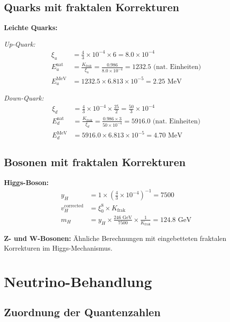 \documentclass[12pt,a4paper]{article}
\begin{document}
\subsection{Quarks mit fraktalen Korrekturen}
\label{subsec:quarks_enhanced}

\textbf{Leichte Quarks:}

\textit{Up-Quark:}
\begin{align}
	\xi_u &= \frac{4}{3} \times 10^{-4} \times 6 = 8.0 \times 10^{-4} \\
	E_u^{\text{nat}} &= \frac{K_{\text{frak}}}{\xi_u} = \frac{0.986}{8.0 \times 10^{-4}} 
	= 1232.5 \text{ (nat. Einheiten)} \\
	E_u^{\text{MeV}} &= 1232.5 \times 6.813 \times 10^{-5} = 2.25 \text{ MeV}
\end{align}

\textit{Down-Quark:}
\begin{align}
	\xi_d &= \frac{4}{3} \times 10^{-4} \times \frac{25}{2} = \frac{50}{3} \times 10^{-4} \\
	E_d^{\text{nat}} &= \frac{K_{\text{frak}}}{\xi_d} = \frac{0.986 \times 3}{50 \times 10^{-4}} 
	= 5916.0 \text{ (nat. Einheiten)} \\
	E_d^{\text{MeV}} &= 5916.0 \times 6.813 \times 10^{-5} = 4.70 \text{ MeV}
\end{align}

\subsection{Bosonen mit fraktalen Korrekturen}
\label{subsec:bosons_enhanced}

\textbf{Higgs-Boson:}
\begin{align}
	y_H &= 1 \times \left(\frac{4}{3} \times 10^{-4}\right)^{-1} = 7500 \\
	v_H^{\text{corrected}} &= \xi_0^8 \times K_{\text{frak}} \\
	m_H &= y_H \times \frac{246 \text{ GeV}}{7500} \times \frac{1}{K_{\text{frak}}} = 124.8 \text{ GeV}
\end{align}

\textbf{Z- und W-Bosonen:} \"A{}hnliche Berechnungen mit eingebetteten fraktalen Korrekturen im Higgs-Mechanismus.

\section{Neutrino-Behandlung}
\label{sec:neutrino_treatment}

\subsection{Zuordnung der Quantenzahlen}
\label{subsec:neutrino_quantum_numbers}
\end{document}
